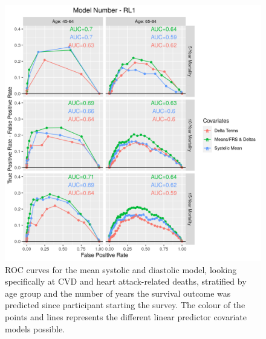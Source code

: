 \documentclass[
]{article}
\begin{document}
\begin{figure}
\centering
\includegraphics{./Rmarkdown_Plots/ROC_CAx-Covariates_EventType_RL1.png}
\caption{ROC curves for the mean systolic and diastolic model, looking specifically at CVD and heart attack-related deaths, stratified by age group and the number of years the survival outcome was predicted since participant starting the survey. The colour of the points and lines represents the different linear predictor covariate models possible.}\label{fig:ROC_RL1}
\end{figure}
\end{document}
